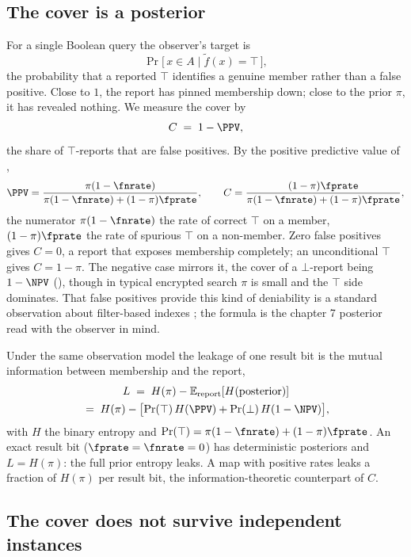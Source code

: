 \subsection*{The cover is a posterior}

For a single Boolean query the observer's target is
\[
  \Pr\bigl[\,x \in A \;\big\vert\; \tilde f(x) = \top\,\bigr],
\]
the probability that a reported $\top$ identifies a genuine member rather
than a false positive. Close to $1$, the report has pinned membership
down; close to the prior $\pi$, it has revealed nothing. We measure the
cover by
\[
  C \;=\; 1 - \PPV,
\]
the share of $\top$-reports that are false positives. By the positive
predictive value of ,
\[
  \PPV = \frac{\pi(1 - \fnrate)}{\pi(1 - \fnrate) + (1 - \pi)\fprate},
  \qquad
  C = \frac{(1 - \pi)\fprate}{\pi(1 - \fnrate) + (1 - \pi)\fprate},
\]
the numerator $\pi(1-\fnrate)$ the rate of correct $\top$ on a member,
$(1-\pi)\fprate$ the rate of spurious $\top$ on a non-member. Zero false
positives gives $C = 0$, a report that exposes membership completely; an
unconditional $\top$ gives $C = 1 - \pi$. The negative case mirrors it,
the cover of a $\bot$-report being $1 - \NPV$ (), though in
typical encrypted search $\pi$ is small and the $\top$ side dominates.
That false positives provide this kind of deniability is a standard
observation about filter-based indexes \parencite{goh-2003}; the formula
is the chapter 7 posterior read with the observer in mind.

\begin{remark}
\label{rem:confidentiality-bits}
Under the same observation model the leakage of one result bit is the
mutual information between membership and the report,
\begin{multline*}
  L \;=\; H(\pi) - \mathbb{E}_{\text{report}}\!\left[H(\text{posterior})\right] \\
  \;=\; H(\pi) - \bigl[\Pr(\top)\,H(\PPV) + \Pr(\bot)\,H(1 - \NPV)\bigr],
\end{multline*}
with $H$ the binary entropy and $\Pr(\top) = \pi(1-\fnrate) +
(1-\pi)\fprate$. An exact result bit ($\fprate = \fnrate = 0$) has
deterministic posteriors and $L = H(\pi)$: the full prior entropy leaks.
A map with positive rates leaks a fraction of $H(\pi)$ per result bit,
the information-theoretic counterpart of $C$.
\end{remark}

\subsection*{The cover does not survive independent instances}

